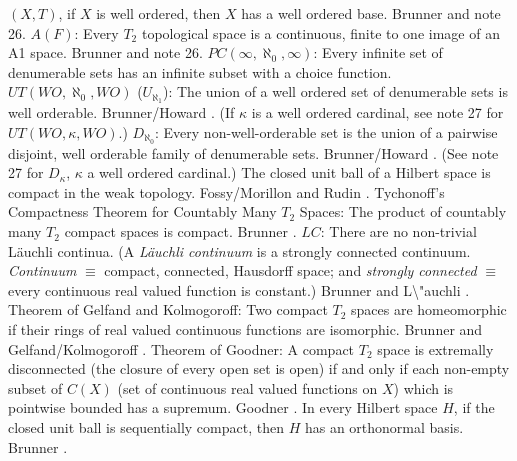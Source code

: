 $(X,T)$, if $X$ is well ordered, then $X$ has a well ordered base.
\ac{Brunner} \cite{1983d} and note 26.
\medskip
{}  $A(F)$:  Every $T_2$ topological space is a
continuous, finite to one image of an A1 space. \ac{Brunner} \cite{1983d}
and note 26.
\medskip
{} $PC(\infty,\aleph_0,\infty)$: Every infinite
set of denumerable sets has an infinite subset with a choice function.
\medskip
{} $UT(WO,\aleph_{0},WO)$ ($U_{\aleph_{1}}$):
The union of a well ordered set of denumerable sets is well  orderable.
\ac{Brunner/Howard} \cite{1992}. (If $\kappa$ is a well ordered cardinal,
see note 27 for $UT(WO,\kappa,WO)$.)
\medskip
{} $D_{\aleph_{0}}$: Every non-well-orderable set is
the union of a pairwise disjoint, well orderable family of denumerable
sets.  \ac{Brunner/Howard} \cite{1992}.  (See note 27 for $D_{\kappa}$,
$\kappa$ a well ordered cardinal.)
\medskip
{} The closed unit ball of a Hilbert space is compact
in the weak topology. \ac{Fossy/Morillon} \cite{1998} and
\ac{Rudin} \cite{1991}.
\medskip
{} Tychonoff's Compactness Theorem for Countably
Many $T_2$ Spaces: The product of countably many $T_2$ compact spaces is
compact. \ac{Brunner} \cite{1983c}. 
\medskip
{} $LC$: There are no non-trivial L\"auchli continua.
(A {\it L\"auchli continuum} is a strongly connected continuum. {\it
Continuum} $\equiv$ compact, connected, Hausdorff space; and {\it strongly
connected} $\equiv$ every continuous real valued function is constant.)
\ac{Brunner} \cite{1983a} and \ac{L\"auchli} \cite{1962}.
\medskip
{} Theorem of Gelfand and Kolmogoroff: Two compact
$T_2$ spaces are  homeomorphic if their rings of real valued continuous
functions are isomorphic. \newline \ac{Brunner} \cite{1983a} and
\ac{Gelfand/Kolmogoroff} \cite{1939}. 
\medskip
{} Theorem of Goodner: A compact $T_{2}$ space is
extremally disconnected (the closure of every open set is open) if and
only if each non-empty subset of $C(X)$ (set of continuous real valued
functions on $X$) which is pointwise bounded has a supremum. \ac{Goodner}
\cite{1950}. 
\medskip
{} In every Hilbert space $H$, if the closed unit
ball is sequentially compact, then $H$ has an orthonormal basis.
\ac{Brunner} \cite{1983b}.
\medskip

